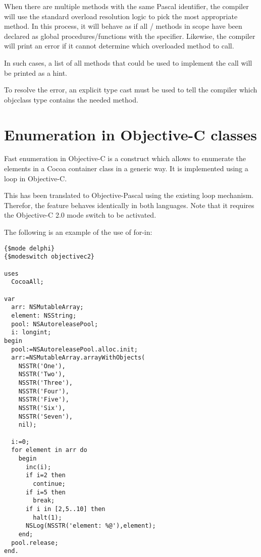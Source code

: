 When there are multiple methods with the same Pascal identifier, the
compiler will use the standard overload resolution logic to pick the most
appropriate method. In this process, it will behave as if all
/ methods in scope have been declared as global
procedures/functions with the  specifier. Likewise, the compiler 
will print an error if it cannot determine which overloaded method to call.

In such cases, a list of all methods that could be used to implement the call
will be printed as a hint.

To resolve the error, an explicit type cast must be used to tell the compiler
which objcclass type contains the needed method.

\section{Enumeration in Objective-C classes}
Fast enumeration in Objective-C is a construct which allows to enumerate
the elements in a Cocoa container class in a generic way. It is implemented
using a  loop in Objective-C.

This has been translated to Objective-Pascal using the existing  
loop mechanism. Therefor, the feature behaves identically in both languages.
Note that it requires the Objective-C 2.0 mode switch to be activated.

The following is an example of the use of for-in:
\begin{verbatim}
{$mode delphi}
{$modeswitch objectivec2}
 
uses
  CocoaAll;
 
var
  arr: NSMutableArray;
  element: NSString;
  pool: NSAutoreleasePool;
  i: longint;
begin
  pool:=NSAutoreleasePool.alloc.init;
  arr:=NSMutableArray.arrayWithObjects(
    NSSTR('One'),
    NSSTR('Two'),
    NSSTR('Three'),
    NSSTR('Four'),
    NSSTR('Five'),
    NSSTR('Six'),
    NSSTR('Seven'),
    nil);
 
  i:=0;
  for element in arr do
    begin
      inc(i);
      if i=2 then
        continue;
      if i=5 then
        break;
      if i in [2,5..10] then
        halt(1);
      NSLog(NSSTR('element: %@'),element);
    end;
  pool.release;
end.
\end{verbatim}

